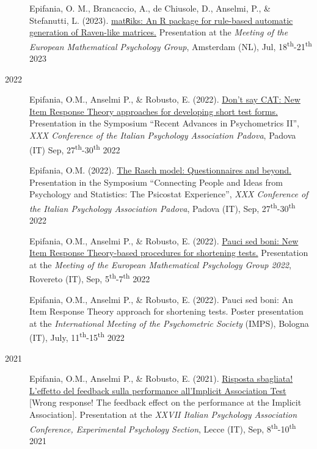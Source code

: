 \documentclass[letterpaper,12pt]{article}
\begin{document}
\begin{description}
	\item[] Epifania, O. M., Brancaccio, A., de Chiusole, D., Anselmi, P., \& Stefanutti, L. (2023). \href{https://ottaviae.github.io/presentations/empg2023/empg2023-Epifania.pdf}{mat\texttt{R}iks: An R package for rule-based automatic generation of Raven-like matrices.} Presentation at the \emph{Meeting of the European Mathematical Psychology Group},  Amsterdam (NL), Jul, 18\textsuperscript{th}-21\textsuperscript{th} 2023
	
	\item[2022]
	\item[] Epifania, O.M., Anselmi P., \& Robusto, E. (2022). \href{https://ottaviae.github.io/presentations/2022/aipIRT.pdf}{Don't say CAT: New Item Response Theory approaches for developing short test forms.} Presentation in the Symposium “Recent Advances in Psychometrics II”, \emph{XXX Conference of the Italian Psychology Association Padova}, Padova (IT) Sep, 27\textsuperscript{th}-30\textsuperscript{th} 2022
	
	\item[] Epifania, O.M. (2022). \href{https://ottaviae.github.io/presentations/2022/epifaniaRasch.pdf}{The Rasch model: Questionnaires and beyond.} Presentation in the Symposium “Connecting People and Ideas from Psychology and Statistics: The Psicostat Experience”, \emph{XXX Conference of the Italian Psychology Association Padova}, Padova (IT), Sep, 27\textsuperscript{th}-30\textsuperscript{th} 2022
	
		\item[] Epifania, O.M., Anselmi P., \& Robusto, E. (2022). \href{https://ottaviae.github.io/presentations/2022/presentationEpifania-empg.pdf}{Pauci sed boni: New Item Response Theory-based procedures for shortening tests.} Presentation at the \emph{Meeting of the European Mathematical Psychology Group 2022},  Rovereto (IT), Sep, 5\textsuperscript{th}-7\textsuperscript{th} 2022
	
	\item[] Epifania, O.M., Anselmi P., \& Robusto, E. (2022). Pauci sed boni: An Item Response Theory approach for shortening tests. Poster presentation at the \emph{International Meeting of the Psychometric Society} (IMPS), Bologna (IT), July, 11\textsuperscript{th}-15\textsuperscript{th} 2022
	
	\item[2021] 	
	\item[] Epifania, O.M., Anselmi P., \& Robusto, E. (2021). \href{https://ottaviae.github.io/presentations/2021/Risposta-sbagliata!.pdf}{Risposta sbagliata! L’effetto del feedback sulla performance all’Implicit Association Test} [Wrong response! The feedback effect on the performance at the Implicit Association]. Presentation at the \emph{XXVII Italian Psychology Association Conference, Experimental Psychology Section}, Lecce (IT), Sep, 8\textsuperscript{th}-10\textsuperscript{th} 2021
	

\end{description}
\end{document}
